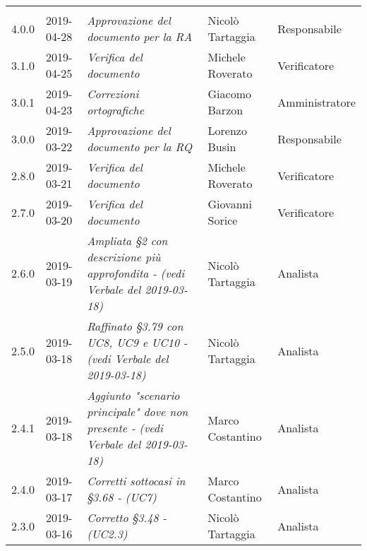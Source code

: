 \newpage 
\section*{}
	\begin{longtable}{C{2cm}|C{2.5cm}|C{4.5cm}|C{2.5cm}|C{3cm}}

	 &  &  &  &   \\
	\endhead
	
		4.0.0 & 2019-04-28 & \emph{Approvazione  del documento per la RA} & Nicolò Tartaggia & Responsabile \\
		\hline
	
		3.1.0 & 2019-04-25 & \emph{Verifica  del documento} & Michele Roverato & Verificatore \\
		\hline
	
		3.0.1 & 2019-04-23 & \emph{Correzioni ortografiche} & Giacomo Barzon & Amministratore \\
		\hline
			
		3.0.0 & 2019-03-22 & \emph{Approvazione del documento per la RQ} & Lorenzo Busin & Responsabile \\
		\hline
		
		2.8.0 & 2019-03-21 & \emph{Verifica del documento} & Michele Roverato & Verificatore \\
		\hline
		
		2.7.0 & 2019-03-20 & \emph{Verifica del documento} & Giovanni Sorice & Verificatore \\
		\hline
		
		2.6.0 & 2019-03-19 & \emph{Ampliata §2 con descrizione più approfondita - (vedi Verbale del 2019-03-18)} & Nicolò Tartaggia  & Analista \\
		\hline
	
		2.5.0 & 2019-03-18 & \emph{Raffinato §3.79 con UC8, UC9 e UC10 - (vedi Verbale del 2019-03-18)} & Nicolò Tartaggia  & Analista \\
		\hline
	
		2.4.1 & 2019-03-18 & \emph{Aggiunto "scenario principale" dove non presente - (vedi Verbale del 2019-03-18)} & Marco Costantino & Analista \\
		\hline
	
		2.4.0 & 2019-03-17 & \emph{Corretti sottocasi in §3.68 - (UC7)} & Marco Costantino & Analista \\
		\hline
	
		2.3.0 & 2019-03-16 & \emph{Corretto §3.48 - (UC2.3)} & Nicolò Tartaggia & Analista \\
		\hline
		

\end{longtable}
